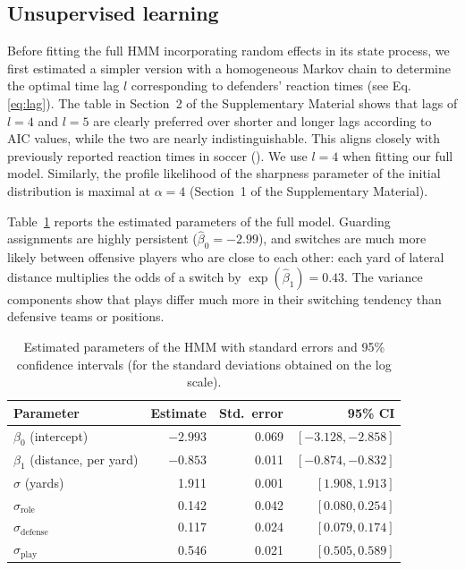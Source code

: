 \documentclass[namedate,webpdf,modern,medium]{oup-authoring-template}
\begin{document}
\subsection{Unsupervised learning}
Before fitting the full HMM incorporating random effects in its state process, we first estimated a simpler version with a homogeneous Markov chain to determine the optimal time lag $l$ corresponding to defenders’ reaction times (see Eq. \ref{eq:lag}). The table in Section~2 of the Supplementary Material shows that lags of $l = 4$ and $l = 5$ are clearly preferred over shorter and longer lags according to AIC values, while the two are nearly indistinguishable. This aligns closely with previously reported reaction times in soccer (\citealp{wu2023evaluation}). We use $l = 4$ when fitting our full model. Similarly, the profile likelihood of the sharpness parameter of the initial distribution is maximal at $\alpha = 4$ (Section~1 of the Supplementary Material).

Table~\ref{tab:fixed} reports the estimated parameters of the full model. Guarding assignments are highly persistent ($\hat\beta_0 = -2.99$), and switches are much more likely between offensive players who are close to each other: each yard of lateral distance multiplies the odds of a switch by $\exp(\hat\beta_1) = 0.43$. The variance components show that plays differ much more in their switching tendency than defensive teams or positions.

\begin{table}[t!]
\centering
\caption{Estimated parameters of the HMM with standard errors and 95\% confidence intervals (for the standard deviations obtained on the log scale).}
\label{tab:fixed}
\begin{tabular}{lrrr}
\hline
Parameter & Estimate & Std.\ error & 95\% CI \\
\hline
$\beta_0$ (intercept) & $-2.993$ & 0.069 & $[-3.128, -2.858]$ \\
$\beta_1$ (distance, per yard) & $-0.853$ & 0.011 & $[-0.874, -0.832]$ \\
$\sigma$ (yards) & 1.911 & 0.001 & $[1.908, 1.913]$ \\
$\sigma_{\text{role}}$ & 0.142 & 0.042 & $[0.080, 0.254]$ \\
$\sigma_{\text{defense}}$ & 0.117 & 0.024 & $[0.079, 0.174]$ \\
$\sigma_{\text{play}}$ & 0.546 & 0.021 & $[0.505, 0.589]$ \\
\hline
\end{tabular}
\end{table}
\end{document}
